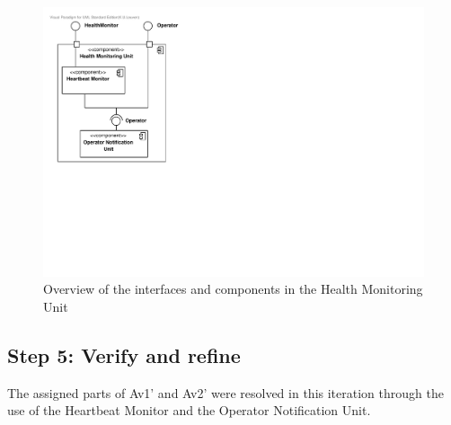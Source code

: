 \begin{figure}[H]
	\begin{centering}
		\includegraphics[width=\textwidth]{figs/add-it8-interfaces.pdf}
		\caption{Overview of the interfaces and components in the Health Monitoring
		Unit}
		\label{fig:it8/interfaces}
	\end{centering}
\end{figure}

\subsection{Step 5: Verify and refine}
\label{add:it8/verification}

\npar The assigned parts of Av1' and Av2' were resolved in this iteration
through the use of the Heartbeat Monitor and the Operator Notification Unit.
